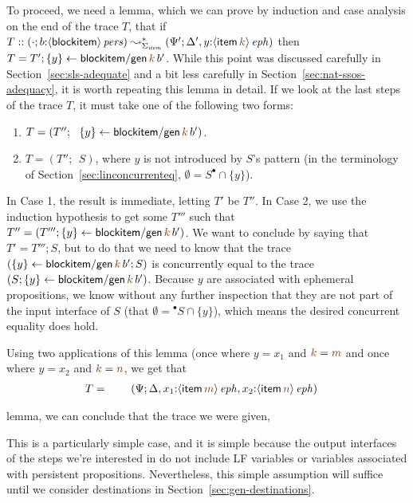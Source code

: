 To proceed, we need a lemma, which we can prove 
by induction
%
and case analysis on the end of the trace $T$, that
if $T ::
(\cdot; b{:}\ispers{\susp{{\sf blockitem}}}) \leadsto^*_{\Sigma_{\it
    item}} (\Psi'; \Delta', y{:}\iseph{\susp{{\sf item}\,\lf{k}}})$
then $T = T'; \trstep{y}{{\sf blockitem/gen}\,\lf{k}\,b'}$.
While this point was discussed carefully in
Section~\ref{sec:sls-adequate} and a bit less carefully in
Section~\ref{sec:nat-ssos-adequacy}, it is worth repeating this
lemma in detail. If we look
at the last steps of the trace $T$, it must take one of the following
two forms:
\smallskip
\begin{enumerate}
\item $T = \left(T''; ~~ \trstep{y}{{\sf blockitem/gen}\,\lf{k}\,b'}
  \right)$.
  
\item $T = \left(T''; ~~ S \right)$, where $y$ is not
  introduced by $S$'s pattern (in the terminology of
  Section~\ref{sec:linconcurrenteq}, $\emptyset = S^{\bullet}
  \cap \{ y \}$).
\end{enumerate}
\smallskip
In Case 1, the result is immediate, letting $T'$ be $T''$. In Case 2, we 
use the induction hypothesis to get some $T'''$ such that
$T'' = \left(T''';
  \trstep{y}{{\sf blockitem/gen}\,\lf{k}\,b'}\right)$.
We want to conclude by saying that 
$T' = T'''; S$, but to do that we need to know that the trace
$\left(\trstep{y}{{\sf blockitem/gen}\,\lf{k}\,b'};
   S\right)$ is concurrently equal to the trace 
$\left(S; 
\trstep{y}{{\sf blockitem/gen}\,\lf{k}\,b'}\right)$.
%
Because $y$ are associated with ephemeral propositions, we
know without any further inspection that they are not part of the
input interface of $S$ (that $\emptyset = {^\bullet}S \cap \{ y
\}$), which means the desired concurrent equality does hold. 

Using two applications of this lemma (once where $y = x_1$ and $\lf{k} = \lf{m}$ and once where $y = x_2$ and $\lf{k} = \lf{n}$, we get that
\begin{align*}
T = ~ & \qquad (\Psi; \Delta, x_1{:}\iseph{\susp{{\sf item}\,\lf{m}}},
          x_2{:}\iseph{\susp{{\sf item}\,\lf{n}}}) 
\end{align*}

 lemma, we can conclude that the trace we were given, 



This is a
particularly simple case, and it is simple because the output
interfaces of the steps we're interested in do not include LF
variables or variables associated with persistent
propositions. Nevertheless, this simple assumption will suffice until
we consider destinations in Section~\ref{sec:gen-destinations}.


